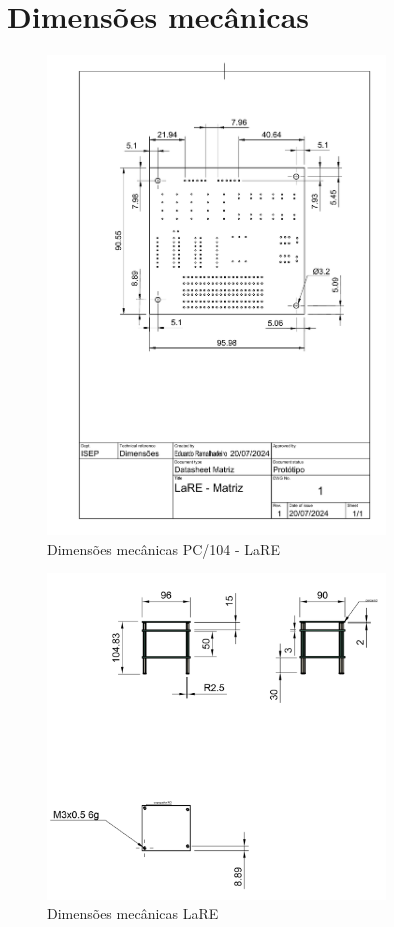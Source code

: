 \documentclass[a4paper,oneside,final,twocolumn]{article}
\begin{document}
\newpage

\section{Dimensões mecânicas}
\begin{figure}[hbtp]
    \centering
    \includegraphics[width=0.8\textwidth]{LaRE-dimesoes_mecanicas.pdf}
    \caption{Dimensões mecânicas PC/104 - LaRE}
    \label{fig:DimensõesmecânicasPC104}
\end{figure}

\raggedright
\begin{figure}[hbtp]
    \centering
    \includegraphics[width=0.8\textwidth]{LaRE_desenhotecnico.png}
    \caption{Dimensões mecânicas LaRE}
    \label{fig:DimensõesmecânicasLaRE}
\end{figure}
\end{document}
